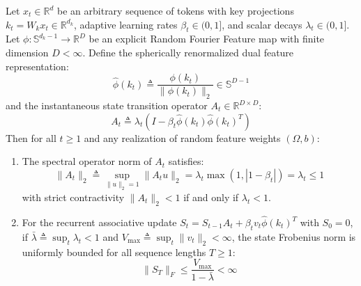 
\begin{theorem}
\label{thm:contractivity}
Let $x_t \in \mathbb{R}^d$ be an arbitrary sequence of tokens with key projections $k_t = W_k x_t \in \mathbb{R}^{d_k}$, adaptive learning rates $\beta_t \in (0, 1]$, and scalar decays $\lambda_t \in (0, 1]$. Let $\phi: \mathbb{S}^{d_k-1} \to \mathbb{R}^D$ be an explicit Random Fourier Feature map with finite dimension $D < \infty$. Define the spherically renormalized dual feature representation:
\begin{equation}
\hat{\phi}(k_t) \triangleq \frac{\phi(k_t)}{\|\phi(k_t)\|_2} \in \mathbb{S}^{D-1}
\label{eq:spherical_renorm_def}
\end{equation}
and the instantaneous state transition operator $A_t \in \mathbb{R}^{D \times D}$:
\begin{equation}
A_t \triangleq \lambda_t \left( I - \beta_t \hat{\phi}(k_t) \hat{\phi}(k_t)^T \right)
\label{eq:operator_a_def}
\end{equation}
Then for all $t \ge 1$ and any realization of random feature weights $(\Omega, b)$:
\begin{enumerate}[label=(\roman*)]
    \item The spectral operator norm of $A_t$ satisfies:
    \begin{equation}
    \|A_t\|_2 \triangleq \sup_{\|u\|_2 = 1} \|A_t u\|_2 = \lambda_t \max\left(1, |1 - \beta_t|\right) = \lambda_t \le 1
    \label{eq:spectral_norm_exact}
    \end{equation}
    with strict contractivity $\|A_t\|_2 < 1$ if and only if $\lambda_t < 1$.
    \item For the recurrent associative update $S_t = S_{t-1} A_t + \beta_t v_t \hat{\phi}(k_t)^T$ with $S_0 = 0$, if $\bar{\lambda} \triangleq \sup_{t} \lambda_t < 1$ and $V_{\max} \triangleq \sup_{t} \|v_t\|_2 < \infty$, the state Frobenius norm is uniformly bounded for all sequence lengths $T \ge 1$:
    \begin{equation}
    \|S_T\|_F \le \frac{V_{\max}}{1 - \bar{\lambda}} < \infty
    \label{eq:state_frobenius_bound}
    \end{equation}
\end{enumerate}
\end{theorem}

